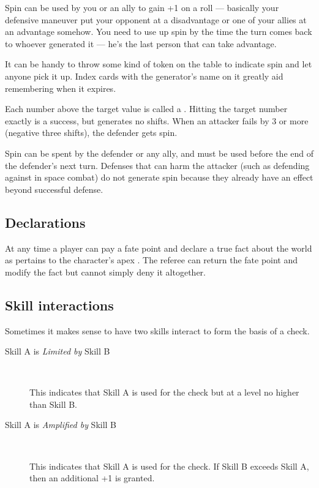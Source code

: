 Spin can be used by you or an ally to gain +1 on a roll --- basically your 
defensive maneuver put your opponent at a disadvantage or one of your allies at 
an advantage somehow. You need to use up spin by the time the turn comes back 
to whoever generated it --- he's the last person that can take advantage.

It can be handy to throw some kind of token on the table to indicate spin and 
let anyone pick it up. Index cards with the generator's name on it greatly aid 
remembering when it expires.

Each number above the target value is called a .
Hitting the target number exactly is a success, but generates no shifts. When an attacker fails by 3 or more (negative three shifts), the defender gets spin.

Spin can be spent by the defender or any ally, and must be used before the end of the defender's next turn. Defenses that can harm the attacker (such as defending against  in space combat) do not generate spin because they already have an effect beyond successful defense.

\subsection{Declarations}
\label{sec:declarations}

At any time a player can pay a fate point and declare a true fact about the world as pertains to the character's apex \Skill. The referee can return the fate point and modify the fact but cannot simply deny it altogether.

\subsection{Skill interactions}\label{sec:skill-interactions} %

Sometimes it makes sense to have two skills interact to form the basis of a
check.
\begin{description}
\item[Skill A is \emph{Limited by} Skill B]~

This indicates that Skill A is used for the check but at a level no
higher than Skill B.
\item[Skill A is \emph{Amplified by} Skill B]~

This indicates that Skill A is used for the check. If Skill B exceeds Skill
A, then an additional +1 is granted.
\end{description}

